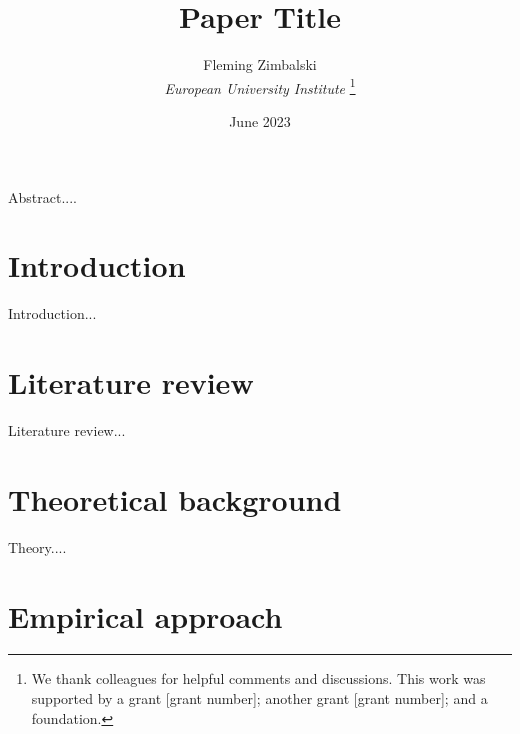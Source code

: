 \documentclass[a4paper,11pt,fleqn]{article}
\newcommand{\bib}{bibliography.bib}
\begin{document}
\title{Paper Title}
\author{Fleming Zimbalski \\ \textit{European University Institute}
\thanks{We thank colleagues for helpful comments and discussions. This work was supported by a grant [grant number]; another grant [grant number]; and a foundation.}}
\date{June 2023}
\begin{titlepage}\maketitle

Abstract....

\end{titlepage}
\section{Introduction}\label{s:introduction}
Introduction...

\section{Literature review}
Literature review...

\section{Theoretical background}
Theory....

\section{Empirical approach}

%
%

\end{document}
